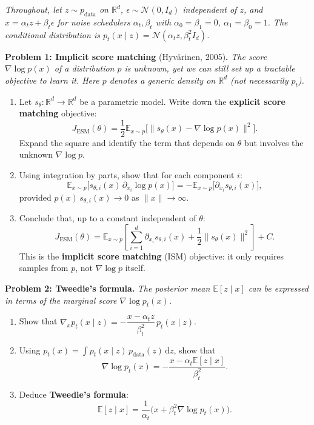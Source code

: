 \documentclass[11pt]{article}
\theoremstyle{definition}
\theoremstyle{remark}
\newcommand{\E}{\mathbb{E}}
\newcommand{\R}{\mathbb{R}}
\newcommand{\N}{\mathcal{N}}
\newcommand{\dd}{\mathrm{d}}
\newcommand{\Id}{I_d}
\begin{document}
\medskip

\textit{Throughout, let $z \sim p_{\mathrm{data}}$ on $\R^d$, $\epsilon \sim \N(0, \Id)$ independent of $z$, and $x = \alpha_t z + \beta_t \epsilon$ for noise schedulers $\alpha_t, \beta_t$ with $\alpha_0 = \beta_1 = 0$, $\alpha_1 = \beta_0 = 1$. The conditional distribution is $p_t(x \mid z) = \N(\alpha_t z, \beta_t^2 \Id)$.}

\medskip

\textbf{Problem 1: Implicit score matching} (Hyv\"arinen, 2005)\textbf{.} \textit{The score $\nabla \log p(x)$ of a distribution $p$ is unknown, yet we can still set up a tractable objective to learn it. Here $p$ denotes a generic density on $\R^d$ (not necessarily $p_t$).}

\begin{enumerate}\renewcommand{\labelenumi}{(\alph{enumi})}
\item Let $s_\theta : \R^d \to \R^d$ be a parametric model. Write down the \textbf{explicit score matching} objective:
\[
J_{\mathrm{ESM}}(\theta) = \frac{1}{2}\E_{x \sim p}\!\bigl[\| s_\theta(x) - \nabla \log p(x) \|^2\bigr].
\]
Expand the square and identify the term that depends on $\theta$ but involves the unknown $\nabla \log p$.

\item Using integration by parts, show that for each component $i$:
\[
\E_{x \sim p}\!\bigl[s_{\theta,i}(x)\, \partial_{x_i} \log p(x)\bigr] = -\E_{x \sim p}\!\bigl[\partial_{x_i} s_{\theta,i}(x)\bigr],
\]
provided $p(x)\, s_{\theta,i}(x) \to 0$ as $\|x\| \to \infty$.

\item Conclude that, up to a constant independent of $\theta$:
\[
\boxed{J_{\mathrm{ESM}}(\theta) = \E_{x \sim p}\!\left[\sum_{i=1}^d \partial_{x_i} s_{\theta,i}(x) + \frac{1}{2}\|s_\theta(x)\|^2\right] + C.}
\]
This is the \textbf{implicit score matching} (ISM) objective: it only requires samples from $p$, not $\nabla \log p$ itself.
\end{enumerate}

\medskip

\textbf{Problem 2: Tweedie's formula.} \textit{The posterior mean $\E[z \mid x]$ can be expressed in terms of the marginal score $\nabla \log p_t(x)$.}

\begin{enumerate}\renewcommand{\labelenumi}{(\alph{enumi})}
\item Show that $\nabla_x p_t(x \mid z) = -\dfrac{x - \alpha_t z}{\beta_t^2}\, p_t(x \mid z)$.

\item Using $p_t(x) = \int p_t(x \mid z)\, p_{\mathrm{data}}(z)\, \dd z$, show that
\[
\nabla \log p_t(x) = -\frac{x - \alpha_t \E[z \mid x]}{\beta_t^2}.
\]

\item Deduce \textbf{Tweedie's formula}:
\[
\boxed{\E[z \mid x] = \frac{1}{\alpha_t}\bigl(x + \beta_t^2 \nabla \log p_t(x)\bigr).}
\]
\end{enumerate}
\end{document}
